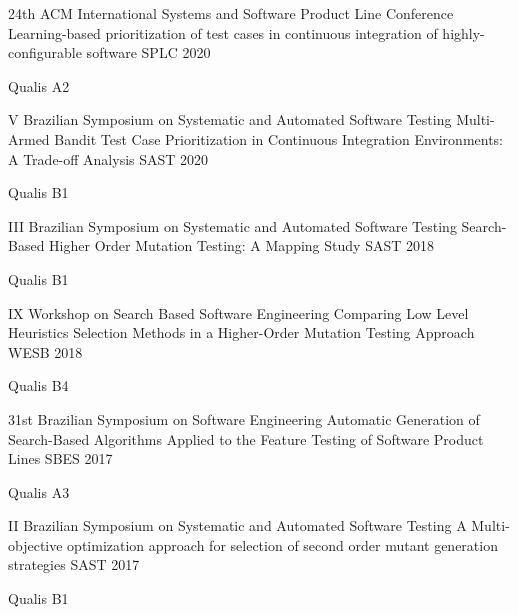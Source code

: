 

\begin{cventries}

	\cventry
	{24th ACM International Systems and Software Product Line Conference} %
	{Learning-based prioritization of test cases in continuous integration of highly-configurable software} %
	{SPLC} %
	{2020} %
	{
		\begin{cvitems} %
			\item {Qualis A2}
		\end{cvitems}
	}

	\cventry
	{V Brazilian Symposium on Systematic and Automated Software Testing} %
	{Multi-Armed Bandit Test Case Prioritization in Continuous Integration Environments: A Trade-off Analysis} %
	{SAST} %
	{2020} %
	{
		\begin{cvitems} %
			\item {Qualis B1}
		\end{cvitems}
	}

	\cventry
	{III Brazilian Symposium on Systematic and Automated Software Testing} %
	{Search-Based Higher Order Mutation Testing: A Mapping Study} %
	{SAST} %
	{2018} %
	{
		\begin{cvitems} %
			\item {Qualis B1}
		\end{cvitems}
	}
	
	\cventry
	{IX Workshop on Search Based Software Engineering} %
	{Comparing Low Level Heuristics Selection Methods in a Higher-Order Mutation Testing Approach} %
	{WESB} %
	{2018} %
	{
		\begin{cvitems} %
			\item {Qualis B4}
		\end{cvitems}
	}

	\cventry
	{31st Brazilian Symposium on Software Engineering} %
	{Automatic Generation of Search-Based Algorithms Applied to the Feature Testing of Software Product Lines} %
	{SBES} %
	{2017} %
	{
		\begin{cvitems} %
			\item {Qualis A3}
		\end{cvitems}
	}

	\cventry
	{II Brazilian Symposium on Systematic and Automated Software Testing} %
	{A Multi-objective optimization approach for selection of second order mutant generation strategies} %
	{SAST} %
	{2017} %
	{
		\begin{cvitems} %
			\item {Qualis B1}
		\end{cvitems}
	}


\end{cventries}
